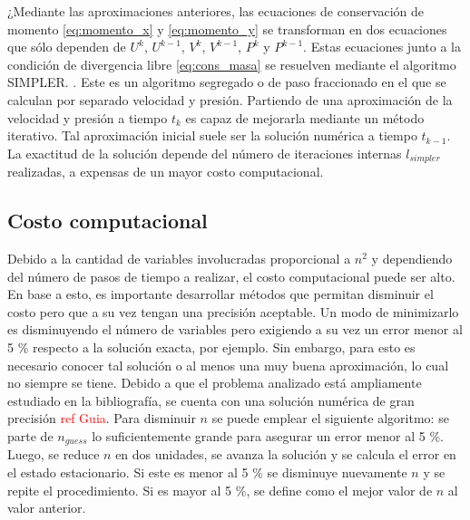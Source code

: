 \documentclass[aps,prb,twocolumn,superscriptaddress,floatfix,longbibliography,10pt]{revtex4-2}
\newif\ifptitle
\newif\ifpnumber
\newcounter{para}
\newcommand\ptitle[1]{\par\refstepcounter{para}
{\ifpnumber{\noindent\textcolor{lightgray}{\textbf{\thepara}}\indent}\fi}
{\ifptitle{\textbf{[{#1}]}}\fi}}
\begin{document}
\ptitle{Algoritmo simpler simplificadamente}
¿Mediante las aproximaciones anteriores, las ecuaciones de conservación de momento \ref{eq:momento_x} y \ref{eq:momento_y} se transforman en dos ecuaciones que sólo dependen de $U^k$, $U^{k-1}$, $V^k$, $V^{k-1}$, $P^k$ y $P^{k-1}$. Estas ecuaciones junto a la condición de divergencia libre \ref{eq:cons_masa} se resuelven mediante el algoritmo SIMPLER. \cite{Patankar}. Este es un algoritmo segregado o de paso fraccionado en el que se calculan por separado velocidad y presión. Partiendo de una aproximación de la velocidad y presión a tiempo $t_k$ es capaz de mejorarla mediante un método iterativo. Tal aproximación inicial suele ser la solución numérica a tiempo $t_{k-1}$. La exactitud de la solución depende del número de iteraciones internas $l_{simpler}$ realizadas, a expensas de un mayor costo computacional.



\subsection{Costo computacional}

\ptitle{Costo computacional y elección de $n$}
Debido a la cantidad de variables involucradas proporcional a $n^2$ y dependiendo del número de pasos de tiempo a realizar, el costo computacional puede ser alto. En base a esto, es importante desarrollar métodos que permitan disminuir el costo pero que a su vez tengan una precisión aceptable. Un modo de minimizarlo es disminuyendo el número de variables pero exigiendo a su vez un error menor al 5 \% respecto a la solución exacta, por ejemplo. Sin embargo, para esto es necesario conocer tal solución o al menos una muy buena aproximación, lo cual no siempre se tiene. Debido a que el problema analizado está ampliamente estudiado en la bibliografía, se cuenta con una solución numérica de gran precisión \textcolor{red}{ref Guia}. Para disminuir $n$ se puede emplear el siguiente algoritmo: se parte de $n_{guess}$ lo suficientemente grande para asegurar un error menor al 5 \%. Luego, se reduce $n$ en dos unidades, se avanza la solución y se calcula el error en el estado estacionario. Si este es menor al 5 \% se disminuye nuevamente $n$ y se repite el procedimiento. Si es mayor al 5 \%, se define como el mejor valor de $n$ al valor anterior.
\end{document}
